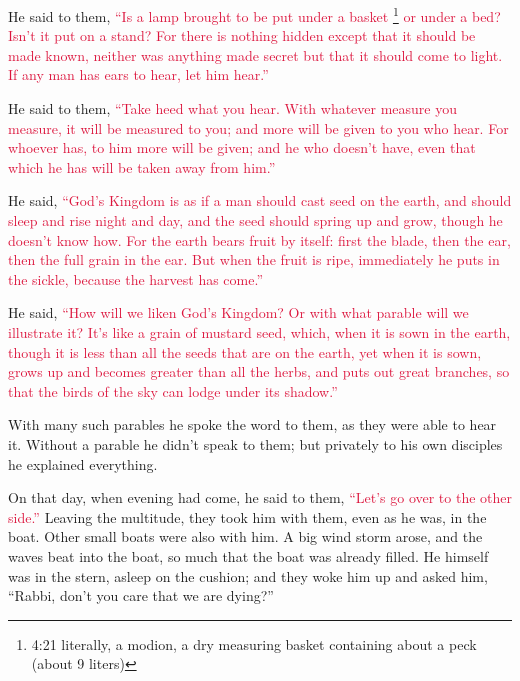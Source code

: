 \myverse{}He said to them,
\textcolor{crimson}{“Is a lamp brought to be put under a basket
}\footnote{4:21 literally, a modion, a dry measuring basket containing about a peck (about 9 liters)}
\textcolor{crimson}{or under a bed? Isn’t it put on a stand?
}
\myverse{}\textcolor{crimson}{For there is nothing hidden except that it should be made known, neither
	was anything made secret but that it should come to light.
}
\myverse{}\textcolor{crimson}{If any man has ears to hear, let him hear.”}

\myverse{}He said to them,
\textcolor{crimson}{“Take heed what you hear. With whatever measure you measure, it will be measured to you; and more
	will be given to you who hear.
}
\myverse{}\textcolor{crimson}{For whoever has, to him more will be given; and he who doesn’t have, even
	that which he has will be taken away from him.”}

\myverse{}He said,
\textcolor{crimson}{“God’s Kingdom is as if a man should cast seed on the earth,
}
\myverse{}\textcolor{crimson}{and should sleep and rise night and day, and the seed should spring up
	and grow, though he doesn’t know how.
}
\myverse{}\textcolor{crimson}{For the earth bears fruit by itself: first the blade, then the ear, then
	the full grain in the ear.
}
\myverse{}\textcolor{crimson}{But when the fruit is ripe, immediately he puts in the sickle, because
	the harvest has come.”}

\myverse{}He said,
\textcolor{crimson}{“How will we liken God’s Kingdom? Or with what parable will we illustrate it?
}
\myverse{}\textcolor{crimson}{It’s like a grain of mustard seed, which, when it is sown in the earth,
	though it is less than all the seeds that are on the earth,
}
\myverse{}\textcolor{crimson}{yet when it is sown, grows up and becomes greater than all the herbs,
	and puts out great branches, so that the birds of the sky can lodge under its shadow.”}

\myverse{}With many such parables he spoke the word to them, as they were
able to hear it.
\myverse{}Without a parable he didn’t speak to them; but privately to his own disciples
he explained everything.

\myverse{}On that day, when evening had come, he said to them,
\textcolor{crimson}{“Let’s go over to the other side.”}
\myverse{}Leaving the multitude, they took him with them, even as he was, in the boat.
Other small boats were also with him.
\myverse{}A big wind storm arose, and the waves beat into the boat, so much that the
boat was already filled.
\myverse{}He himself was in the stern, asleep on the cushion; and they woke him up and
asked him, “Rabbi, don’t you care that we are dying?”

